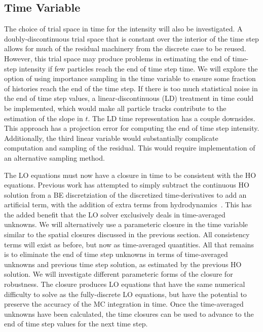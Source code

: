 \subsection{Time Variable}

The choice of trial space in time for the intensity will also be investigated.  A doubly-discontinuous
trial space that is constant over the interior of the time step allows for much of the
residual machinery from the discrete case to be reused.  However, this trial space may produce problems in estimating the end of
time-step intensity if few particles reach the end of time step time.  We will explore the
option of using importance sampling in the time variable to ensure some fraction of
histories reach the end of the time step.  If there is too much statistical noise in the
end of time step values, a
linear-discontinuous (LD) treatment in time could be implemented, which would make all
particle tracks contribute to the estimation of the slope in $t$.  The LD time
representation has a couple downsides.  This approach has a projection error for computing
the end of time step intensity.  Additionally, the third linear variable would
substantially complicate computation and sampling of the residual.  This would require
implementation of an alternative sampling method.

The LO equations must now have a closure in time to be consistent with the HO equations. 
Previous work has attempted to simply subtract the continuous HO solution
from a BE discretziation of the discretized time-derivatives to add an artificial
term, with the addition of extra terms from hydrodynamics~\cite{holo_rh}.  This has the added benefit that the LO solver exclusively deals in
time-averaged unknowns.  We will alternatively use a parameteric closure in the time
variable similar to the spatial closures discussed in the previous section.  All
consistency terms will exist as before, but now as time-averaged quantities.  All that
remains is to eliminate the end of time step unknowns in terms of time-averaged
unknowns and previous time step solution, as estimated by the previous HO solution.  We
will investigate different parameteric forms of the closure for robustness.  The closure
produces LO equations that have the same numerical difficulty to solve as the fully-discrete LO equations, but
have the potential to preserve the accuracy of the MC integration in time.   Once the time-averaged unknowns have been calculated,
the time closures can be used to advance to the end of time step values for the next
time step.
%


